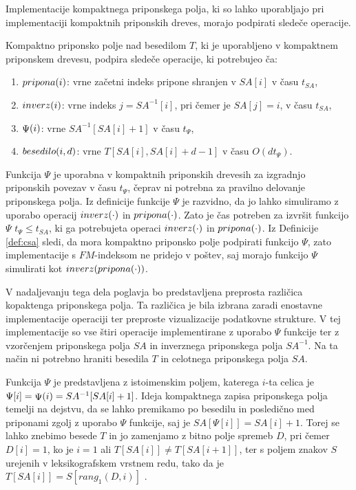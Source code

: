 Implementacije kompaktnega priponskega polja, ki so lahko uporabljajo pri implementaciji kompaktnih priponskih dreves, morajo podpirati sledeče operacije.

\begin{defi}\label{def:csa}
     Kompaktno priponsko polje nad besedilom $T$, ki je uporabljeno v kompaktnem priponskem drevesu, podpira sledeče operacije, ki potrebujeo ča:
    \begin{enumerate}
        \item $ \mathop{pripona}(i) $: vrne začetni indeks pripone shranjen v $SA[i]$ v času $t_{SA}$,
        \item $ \mathop{inverz}(i) $: vrne indeks $j=SA^{-1}[i]$, pri čemer je $SA[j]=i$, v času $t_{SA}$,
        \item $ \mathop{\Psi}(i) $: vrne $SA^{-1}[SA[i]+1]$ v času $t_\Psi$,
        \item $ \mathop{besedilo}(i,d) $: vrne $T[SA[i],SA[i]+d-1]$ v času $O(dt_\Psi)$.
    \end{enumerate}    
\end{defi}

Funkcija $\Psi$ je uporabna v kompaktnih priponskih drevesih za izgradnjo priponskih povezav v času $t_\Psi$, čeprav ni potrebna za pravilno delovanje priponskega polja. Iz definicije funkcije $\Psi$ je razvidno, da jo lahko simuliramo z uporabo operacij $ \mathop{inverz}(\cdot) $ in $ \mathop{pripona}(\cdot) $. Zato je čas potreben za izvršit funkcijo $\Psi$ $t_\Psi\le t_{SA}$, ki ga potrebujeta operaci $ \mathop{inverz}(\cdot) $ in $ \mathop{pripona}(\cdot) $. Iz Definicije \ref{def:csa} sledi, da mora kompaktno priponsko polje podpirati funkcijo $\Psi$, zato implementacije s $FM$-indeksom ne pridejo v poštev, saj morajo funkcijo $\Psi$ simulirati kot $ \mathop{inverz}( \mathop{pripona}(\cdot) ) $.

V nadaljevanju tega dela poglavja bo predstavljena preprosta različica kopaktenga priponskega polja. Ta različica je bila izbrana zaradi enostavne implementacije operaciji ter preproste vizualizacije podatkovne strukture. V tej implementacije so vse štiri operacije implementirane z uporabo $\Psi$ funkcije ter z vzorčenjem priponskega polja $SA$ in inverznega priponskega polja $SA^{-1}$. Na ta način ni potrebno hraniti besedila $T$ in celotnega priponskega polja $SA$.

Funkcija $\Psi$ je predstavljena z istoimenskim poljem, katerega $i$-ta celica je $\Psi[i]= \mathop{\Psi}(i) =SA^{-1}[SA[i]+1]$. Ideja kompaktnega zapisa priponskega polja temelji na dejstvu, da se lahko premikamo po besedilu in posledično med priponami zgolj z uporabo $\Psi$ funkcije, saj je $SA[\Psi[i]]=SA[i]+1$. Torej se lahko znebimo besede $T$ in jo zamenjamo z bitno polje spremeb $D$, pri čemer $D[i]=1$, ko je $i=1$ ali $T[SA[i]]\ne T[SA[i+1]]$, ter s poljem znakov $S$ urejenih v leksikografskem vrstnem redu, tako da je $T[SA[i]]=S[rang_1(D,i)]$ \cite{Navarro2016}.

